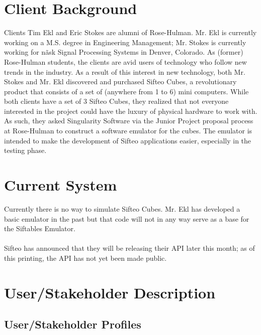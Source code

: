 \documentclass[12pt]{article}
\begin{document}
\section{Client Background}
Clients Tim Ekl and Eric Stokes are alumni of Rose-Hulman. Mr. Ekl is currently working on a M.S. degree in Engineering Management; Mr. Stokes is currently working for n\~ask Signal Processing Systems in Denver, Colorado. As (former) Rose-Hulman students, the clients are avid users of technology who follow new trends in the industry. As a result of this interest in new technology, both Mr. Stokes and Mr. Ekl discovered and purchased Sifteo Cubes, a revolutionary product that consists of a set of (anywhere from 1 to 6) mini computers. While both clients have a set of 3 Sifteo Cubes, they realized that not everyone interested in the project could have the luxury of physical hardware to work with. As such, they asked Singularity Software \- via the Junior Project proposal process at Rose-Hulman \- to construct a software emulator for the cubes. The emulator is intended to make the development of Sifteo applications easier, especially in the testing phase.

\section{Current System}
Currently there is no way to simulate Sifteo Cubes. Mr. Ekl has developed a basic emulator in the past but that code will not in any way serve as a base for the Siftables Emulator.\\\\
Sifteo has announced that they will be releasing their API later this month; as of this printing, the API has not yet been made public.

\section{User/Stakeholder Description}

               \subsection{User/Stakeholder Profiles}
\end{document}
